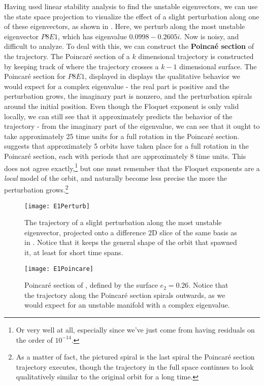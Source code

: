 Having used linear stability analysis to find the unstable eigenvectors, we can use the state space projection to visualize the effect of a slight perturbation along one of these eigenvectors, as shown in . Here, we perturb along the most unstable eigenvector $P8E1$, which has eigenvalue $0.0998 - 0.2605 i$. Now  is noisy, and difficult to analyze. To deal with this, we can construct the {\bf Poinca\'e section} of the trajectory. The Poincar\'e section of a $k$ dimensional trajectory is constructed by keeping track of where the trajectory crosses a $k-1$ dimensional surface. The Poincar\'e section for  $P8E1$, displayed in  displays the qualitative behavior we would expect for a complex eigenvalue - the real part is positive and the perturbation grows, the imaginary part is nonzero, and the perturbation spirals around the initial position. Even though the Floquet exponent is only valid locally, we can still see that it approximately predicts the behavior of the trajectory - from the imaginary part of the eigenvalue, we can see that it ought to take approximately 25 time units for a full rotation in the Poincar\'e section.  suggests that approximately 5 orbits have taken place for a full rotation in the Poincar\'e section, each with periods that are approximately 8 time units. This does not agree exactly,\footnote{Or very well at all, especially since we've just come from having residuals on the order of $10^{-14}$.} but one must remember that the Floquet exponents are a \emph{local} model of the orbit, and naturally become less precise the more the perturbation grows.\footnote{As a matter of fact, the pictured spiral is the last spiral the Poincar\'e section trajectory executes, though the trajectory in the full space continues to look qualitatively similar to the original orbit for a long time.}   


\begin{figure}[h!]
\centerline{\texttt{[image: E1Perturb]}}
\caption{The trajectory of a slight perturbation along the most unstable eigenvector, projected onto a difference 2D slice of the same basis as in . Notice that it keeps the general shape of the orbit that spawned it, at least for short time spans.}\label{fig:p8E1}
\end{figure}

\begin{figure}[h!]
\centerline{\texttt{[image: E1Poincare]}}
\caption{Poincar\'e section of , defined by the surface $e_2 = 0.26$. Notice that the trajectory along the Poincar\'e section spirals outwards, as we would expect for an unstable manifold with a complex eigenvalue.}\label{fig:E1Poincare}
\end{figure}

